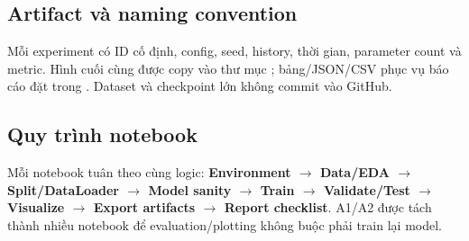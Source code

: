 \subsection{Artifact và naming convention}
Mỗi experiment có ID cố định, config, seed, history, thời gian, parameter count và metric. Hình cuối cùng được copy vào thư mục ; bảng/JSON/CSV phục vụ báo cáo đặt trong . Dataset và checkpoint lớn không commit vào GitHub.

\subsection{Quy trình notebook}
Mỗi notebook tuân theo cùng logic: \textbf{Environment $\rightarrow$ Data/EDA $\rightarrow$ Split/DataLoader $\rightarrow$ Model sanity $\rightarrow$ Train $\rightarrow$ Validate/Test $\rightarrow$ Visualize $\rightarrow$ Export artifacts $\rightarrow$ Report checklist}. A1/A2 được tách thành nhiều notebook để evaluation/plotting không buộc phải train lại model.
